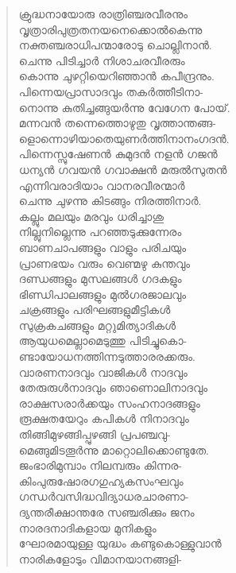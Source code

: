 \begin{verse}
ക്രുദ്ധനായോരു രാത്രിഞ്ചരവീരനും\\
വൃത്രാരിപുത്രതനയനെക്കൊല്‍കെന്നു\\
നക്തഞ്ചരാധിപന്മാരോടു ചൊല്ലിനാന്‍.\\
ചെന്നു പിടിച്ചാര്‍ നിശാചരവീരരും\\
കൊന്നു ചുഴറ്റിയെറിഞ്ഞാന്‍ കപീന്ദ്രനും.\\
പിന്നെയപ്രാസാദവും തകര്‍ത്തീടിനാ-\\
നൊന്നു കുതിച്ചങ്ങുയര്‍ന്നു വേഗേന പോയ്.\\
മന്നവന്‍ തന്നെത്തൊഴുതു വൃത്താന്തങ്ങ-\\
ളൊന്നൊഴിയാതെയുണര്‍ത്തിനാനംഗദന്‍.\\
പിന്നെസ്സുഷേണന്‍ കുമുദന്‍ നളന്‍ ഗജന്‍\\
ധന്യന്‍ ഗവയന്‍ ഗവാക്ഷന്‍ മരുല്‍സുതന്‍\\
എന്നിവരാദിയാം വാനരവീരന്മാര്‍\\
ചെന്നു ചുഴന്നു കിടങ്ങും നിരത്തിനാര്‍.\\
കല്ലും മലയും മരവും ധരിച്ചാശു\\
നില്ലുനില്ലെന്നു പറഞ്ഞടുക്കുന്നേരം\\
ബാണചാപങ്ങളും വാളും പരിചയും\\
പ്രാണഭയം വരും വെണ്മഴു കുന്തവും\\
ദണ്ഡങ്ങളും മുസലങ്ങള്‍ ഗദകളും\\
ഭിണ്ഡിപാലങ്ങളും മുല്‍ഗരജാലവും\\
ചക്രങ്ങളും പരിഘങ്ങളുമീട്ടികള്‍\\
സുക്രകചങ്ങളും മറ്റുമിത്യാദികള്‍\\
ആയുധമെല്ലാമെടുത്തു പിടിച്ചുകൊ-\\
ണ്ടായോധനത്തിന്നടുത്താരരക്കരും.\\
വാരണനാദവും വാജികള്‍ നാദവും\\
തേരുരുള്‍നാദവും ഞാണൊലിനാദവും\\
രാക്ഷസരാര്‍ക്കയും സംഹനാദങ്ങളും\\
രൂക്ഷതയേറും കപികള്‍ നിനാദവും\\
തിങ്ങിമുഴങ്ങിപ്പുഴങ്ങി പ്രപഞ്ചവു-\\
മെങ്ങുമിടതൂര്‍ന്നു മാറ്റൊലിക്കൊണ്ടുതേ.\\
ജംഭാരിമുമ്പാം നിലമ്പരും കിന്നര-\\
കിംപുരുഷോരഗഗുഹ്യകസംഘവും\\
ഗന്ധര്‍വസിദ്ധവിദ്യാധരചാരണാ-\\
ദ്യന്തരീക്ഷാന്തരേ സഞ്ചരിക്കും ജനം\\
നാരദനാദികളായ മുനികളും\\
ഘോരമായുള്ള യുദ്ധം കണ്ടുകൊള്ളുവാന്‍\\
നാരികളോടും വിമാനയാനങ്ങളി-\\

\end{verse}
